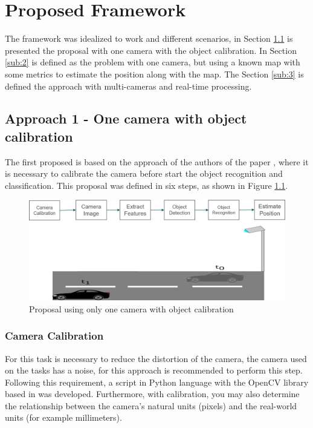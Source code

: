 
\chapter{Proposed Framework}
\label{capitulo4}
The framework was idealized to work and different scenarios, in Section \ref{sub:1} is presented the proposal with one camera with the object calibration. In Section \ref{sub:2} is defined as the problem with one camera, but using a known map with some metrics to estimate the position along with the map. The Section \ref{sub:3} is defined the approach with multi-cameras and real-time processing. 



\section{Approach 1 - One camera with object calibration}\label{sub:1}

The first proposed is based on the approach of the authors of the paper \cite{8678911}, where it is necessary to calibrate the camera before start the object recognition and classification. This proposal was defined in six steps, as shown in Figure \ref{fig:proposal1}.

\begin{figure}[H]
\centering
\includegraphics[width=\textwidth]{imagens/proposal1.png}
\caption{Proposal using only one camera with object calibration}
\label{fig:proposal1}
\end{figure}

\subsection{Camera Calibration}

For this task is necessary to reduce the distortion of the camera, the camera used on the tasks has a noise, for this approach is recommended to perform this step. Following this requirement, a script in Python language with the OpenCV library based in \cite{zhu2020camera} was developed. Furthermore, with calibration, you may also determine the relationship between the camera’s natural units (pixels) and the real-world units (for example millimeters).

